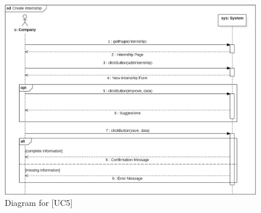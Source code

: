 \begin{figure} [H]
    \centering
    \includegraphics[width=1\linewidth]{Use Cases Images/create_internship.png}
    \caption{Diagram for [UC5]}
    \label{fig: Create Internship Diagram}
\end{figure}

